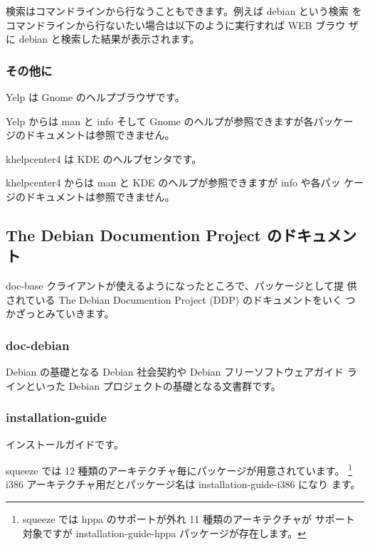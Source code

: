 \documentclass[mingoth,a4paper]{jsarticle}
\begin{document}
検索はコマンドラインから行なうこともできます。例えば debian という検索
をコマンドラインから行ないたい場合は以下のように実行すれば WEB ブラウ
ザに debian と検索した結果が表示されます。



\subsubsection{その他に}


Yelp は Gnome のヘルプブラウザです。

Yelp からは man と info そして Gnome のヘルプが参照できますが各パッケー
ジのドキュメントは参照できません。


khelpcenter4 は KDE のヘルプセンタです。

khelpcenter4 からは man と KDE のヘルプが参照できますが info や各パッ
ケージのドキュメントは参照できません。

\newpage

\subsection{The Debian Documention Project のドキュメント}
doc-base クライアントが使えるようになったところで、パッケージとして提
供されている The Debian Documention Project (DDP) のドキュメントをいく
つかざっとみていきます。


\subsubsection{doc-debian}
Debian の基礎となる Debian 社会契約や Debian フリーソフトウェアガイド
ラインといった Debian プロジェクトの基礎となる文書群です。


\subsubsection{installation-guide}
インストールガイドです。

squeeze では 12 種類のアーキテクチャ毎にパッケージが用意されています。
\footnote{squeeze では hppa のサポートが外れ 11 種類のアーキテクチャが
サポート対象ですが installation-guide-hppa パッケージが存在します。}
i386 アーキテクチャ用だとパッケージ名は installation-guide-i386 になり
ます。
\end{document}
